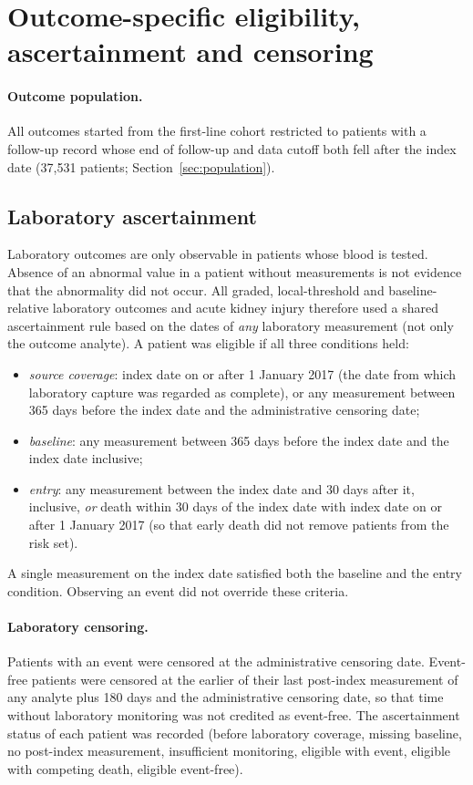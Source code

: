\documentclass[10pt]{article}
\begin{document}
\section{Outcome-specific eligibility, ascertainment and censoring}\label{sec:elig}

\paragraph{Outcome population.} All outcomes started from the first-line
cohort restricted to patients with a follow-up record whose end of follow-up
and data cutoff both fell after the index date (37,531 patients;
Section~\ref{sec:population}).

\subsection{Laboratory ascertainment}\label{sec:labrule}
Laboratory outcomes are only observable in patients whose blood is tested.
Absence of an abnormal value in a patient without measurements is not evidence
that the abnormality did not occur. All graded, local-threshold and
baseline-relative laboratory outcomes and acute kidney injury therefore used
a shared ascertainment rule based on the dates of \emph{any} laboratory
measurement (not only the outcome analyte). A patient was eligible if all three
conditions held:
\begin{itemize}
\item \emph{source coverage}: index date on or after 1 January 2017 (the date
from which laboratory capture was regarded as complete), or any measurement
between 365 days before the index date and the administrative censoring date;
\item \emph{baseline}: any measurement between 365 days before the index date
and the index date inclusive;
\item \emph{entry}: any measurement between the index date and 30 days after
it, inclusive, \emph{or} death within 30 days of the index date with index
date on or after 1 January 2017 (so that early death did not remove patients
from the risk set).
\end{itemize}
A single measurement on the index date satisfied both the baseline and the
entry condition. Observing an event did not override these criteria.

\paragraph{Laboratory censoring.} Patients with an event were censored at the
administrative censoring date. Event-free patients were censored at the
earlier of their last post-index measurement of any analyte plus 180 days and
the administrative censoring date, so that time without laboratory monitoring
was not credited as event-free. The ascertainment status of each patient was
recorded (before laboratory coverage, missing baseline, no post-index
measurement, insufficient monitoring, eligible with event, eligible with
competing death, eligible event-free).
\end{document}
